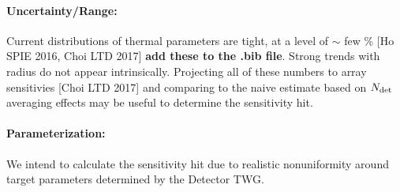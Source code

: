 \paragraph{Uncertainty/Range:}
Current distributions of thermal parameters are tight, at a level of $\sim$ few \% [Ho SPIE 2016, Choi LTD 2017] \textbf{add these to the .bib file}. Strong trends with radius do not appear intrinsically. Projecting all of these numbers to array sensitivies [Choi LTD 2017] and comparing to the naive estimate based on $N_{\mbox{\scriptsize det}}$ averaging effects may be useful to determine the sensitivity hit.

\paragraph{Parameterization:}
We intend to calculate the sensitivity hit due to realistic nonuniformity around target parameters determined by the Detector TWG.
